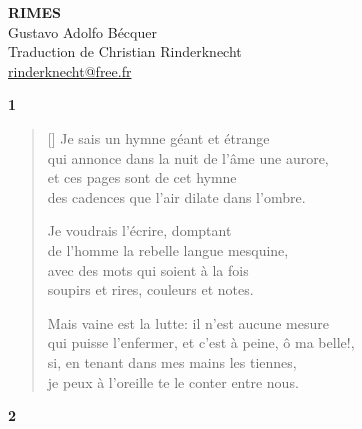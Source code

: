 \documentclass[a4paper,12pt]{book}
\begin{document}
\thispagestyle{empty}
\vspace*{70mm}
\begin{center}
{\Huge\textbf{RIMES}} \\
\vspace*{10mm}
{\Large Gustavo Adolfo Bécquer} \\
\vspace*{10mm}
Traduction de Christian Rinderknecht\\
\url{rinderknecht@free.fr}
\end{center}

\cleardoublepage

\frenchspacing  %

\begin{center}
  \textbf{1}
\end{center}

\settowidth{\versewidth}{qui puisse l'enfermer, et c'est à peine, ô ma belle!,}

\begin{verse}[\versewidth]
  Je sais un hymne géant et étrange \\
  qui annonce dans la nuit de l'âme une aurore, \\
  et ces pages sont de cet hymne \\
  des cadences que l'air dilate dans l'ombre.

  Je voudrais l'écrire, domptant \\
  de l'homme la rebelle langue mesquine, \\
  avec des mots qui soient à la fois \\
  soupirs et rires, couleurs et notes.

  Mais vaine est la lutte: il n'est aucune mesure \\
  qui puisse l'enfermer, et c'est à peine, ô ma belle!, \\
  si, en tenant dans mes mains les tiennes, \\
  je peux à l'oreille te le conter entre nous.
\end{verse}

\bigskip

\begin{center}
  \textbf{2}
\end{center}

\settowidth{\versewidth}{où, tremblante, elle se plantera;}
\end{document}
